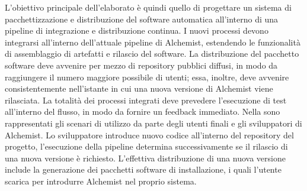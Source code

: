 L'obiettivo principale dell'elaborato è quindi quello di progettare un sistema di pacchettizzazione e distribuzione del software automatica all'interno di una pipeline di integrazione e distribuzione continua. I nuovi processi devono integrarsi all'interno dell'attuale pipeline di Alchemist, estendendo le funzionalità di assemblaggio di artefatti e rilascio del software. La distribuzione del pacchetto software deve avvenire per mezzo di repository pubblici diffusi, in modo da raggiungere il numero maggiore possibile di utenti; essa, inoltre, deve avvenire consistentemente nell'istante in cui una nuova versione di Alchemist viene rilasciata. La totalità dei processi integrati deve prevedere l'esecuzione di test all'interno del flusso, in modo da fornire un feedback immediato. Nella  sono rappresentati gli scenari di utilizzo da parte degli utenti finali e gli sviluppatori di Alchemist. Lo sviluppatore introduce nuovo codice all'interno del repository del progetto, l'esecuzione della pipeline determina successivamente se il rilascio di una nuova versione è richiesto. L'effettiva distribuzione di una nuova versione include la generazione dei pacchetti software di installazione, i quali l'utente scarica per introdurre Alchemist nel proprio sistema.